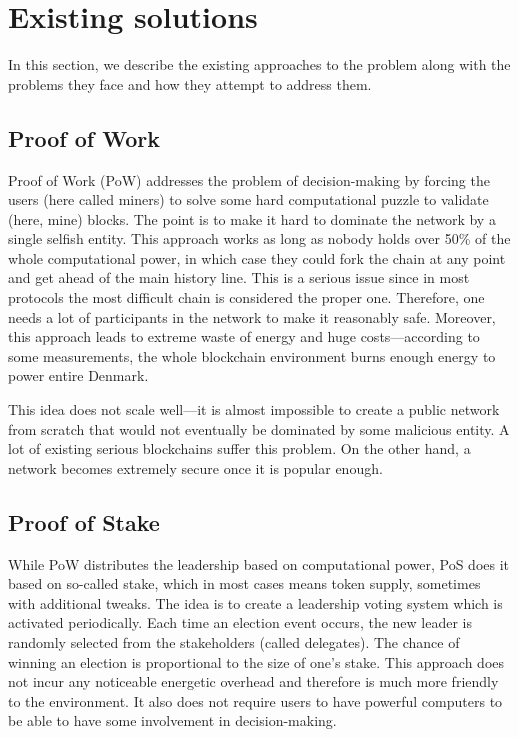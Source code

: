 \section{Existing solutions}

In this section, we describe the existing approaches to the problem along with
the problems they face and how they attempt to address them.

\subsection{Proof of Work}

Proof of Work (PoW) addresses the problem of decision-making by forcing the
users (here called miners) to solve some hard computational puzzle to validate
(here, mine) blocks\cite{bitcoin}. The point is to make it hard to dominate the
network by a single selfish entity. This approach works as long as nobody holds
over 50\% of the whole computational power, in which case they could fork the
chain at any point and get ahead of the main history line. This is a serious
issue since in most protocols the most difficult chain is considered the proper
one. Therefore, one needs a lot of participants in the network to make it
reasonably safe. Moreover, this approach leads to extreme waste of energy and
huge costs---according to some measurements, the whole blockchain environment
burns enough energy to power entire Denmark\cite{bitcoin_energy}.

This idea does not scale well---it is almost impossible to create a public
network from scratch that would not eventually be dominated by some malicious
entity. A lot of existing serious blockchains suffer this
problem\cite{51attack}. On the other hand, a network becomes extremely secure
once it is popular enough.

\subsection{Proof of Stake}

While PoW distributes the leadership based on computational power, PoS does it
based on so-called stake, which in most cases means token supply, sometimes with
additional tweaks\cite{peercoin,cryptocurr_without_pow}. The idea is to
create a leadership voting system which is activated periodically. Each time an
election event occurs, the new leader is randomly selected from the stakeholders
(called delegates). The chance of winning an election is proportional to the
size of one's stake. This approach does not incur any noticeable energetic
overhead and therefore is much more friendly to the environment. It also does
not require users to have powerful computers to be able to have some involvement
in decision-making.

